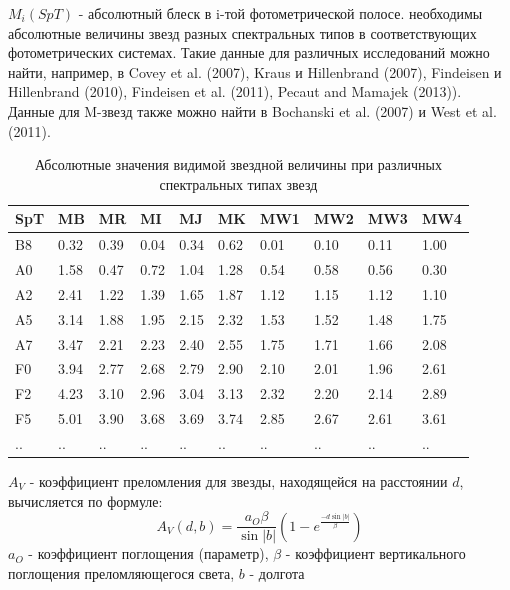 \documentclass[12pt, a4paper]{article}
\begin{document}
	$M_i(SpT)$ - абсолютный блеск в i-той фотометрической полосе. необходимы абсолютные величины звезд разных спектральных типов в соответствующих фотометрических системах. Такие данные для различных исследований можно найти, например, в Covey et al. (2007), Kraus и Hillenbrand (2007), Findeisen и Hillenbrand (2010), Findeisen et al. (2011), Pecaut and Mamajek (2013)). Данные для M-звезд также можно найти в Bochanski et al. (2007) и West et al. (2011).
	\newline
	\begin{table}[h]
	\centering
	\small
	\setlength{\tabcolsep}{3pt}
	\begin{tabular}{|l|l|l|l|l|l|l|l|l|l|}
	\hline
	SpT & MB    & MR    & MI    & MJ    & MK    & MW1   & MW2   & MW3   & MW4   \\ \hline
	B8  & 0.32  & 0.39  & 0.04  & 0.34  & 0.62  & 0.01  & 0.10  & 0.11  & 1.00  \\ \hline
	A0  & 1.58  & 0.47  & 0.72  & 1.04  & 1.28  & 0.54  & 0.58  & 0.56  & 0.30  \\ \hline
	A2  & 2.41  & 1.22  & 1.39  & 1.65  & 1.87  & 1.12  & 1.15  & 1.12  & 1.10  \\ \hline
	A5  & 3.14  & 1.88  & 1.95  & 2.15  & 2.32  & 1.53  & 1.52  & 1.48  & 1.75  \\ \hline
	A7  & 3.47  & 2.21  & 2.23  & 2.40  & 2.55  & 1.75  & 1.71  & 1.66  & 2.08  \\ \hline
	F0  & 3.94  & 2.77  & 2.68  & 2.79  & 2.90  & 2.10  & 2.01  & 1.96  & 2.61  \\ \hline
	F2  & 4.23  & 3.10  & 2.96  & 3.04  & 3.13  & 2.32  & 2.20  & 2.14  & 2.89  \\ \hline
	F5  & 5.01  & 3.90  & 3.68  & 3.69  & 3.74  & 2.85  & 2.67  & 2.61  & 3.61  \\ \hline
	..  & ..    & ..    & ..    & ..    & ..    & ..    & ..    & ..    & ..    \\ \hline
	\end{tabular}
	\caption{Абсолютные значения видимой звездной величины при различных спектральных типах звезд}
	\end{table}
	\newpage
	$A_V$ - коэффициент преломления для звезды, находящейся на расстоянии $d$, вычисляется по формуле:
	$$
	A_V(d, b) = \frac{a_O \beta}{\sin |b|} \left( 1 - e^{\frac{-d \sin |b|}{\beta}}\right)
	$$
	$a_O$ - коэффициент поглощения (параметр),
	$\beta$ - коэффициент вертикального поглощения преломляющегося света,
	$b$ - долгота
\end{document}
